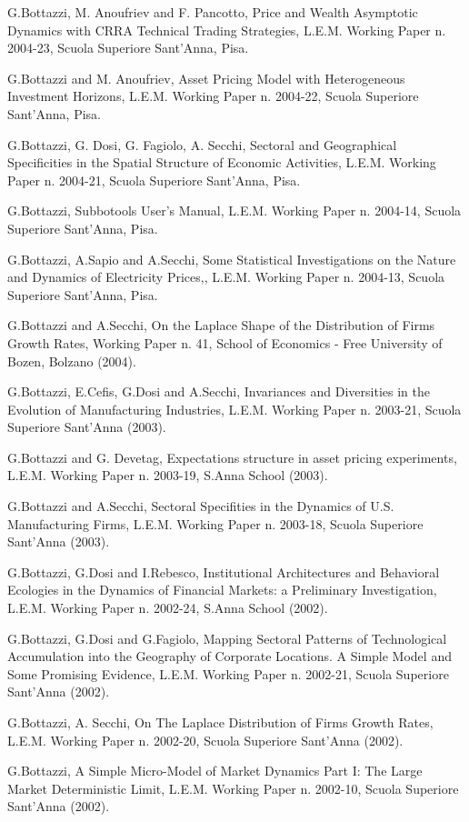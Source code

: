\documentclass[a4paper]{article}
\begin{document}
G.Bottazzi, M. Anoufriev and F. Pancotto, Price and Wealth Asymptotic
Dynamics with CRRA Technical Trading Strategies, L.E.M. Working Paper
n. 2004-23, Scuola Superiore Sant'Anna, Pisa.

G.Bottazzi and M. Anoufriev, Asset Pricing Model with Heterogeneous
Investment Horizons, L.E.M. Working Paper n. 2004-22, Scuola Superiore
Sant'Anna, Pisa.

G.Bottazzi, G. Dosi, G. Fagiolo, A. Secchi, Sectoral and Geographical
Specificities in the Spatial Structure of Economic Activities,
L.E.M. Working Paper n. 2004-21, Scuola Superiore Sant'Anna, Pisa.

G.Bottazzi, Subbotools User's Manual, L.E.M. Working Paper n.
2004-14, Scuola Superiore Sant'Anna, Pisa.

G.Bottazzi, A.Sapio and A.Secchi, Some Statistical Investigations on
the Nature and Dynamics of Electricity Prices,, L.E.M. Working Paper
n. 2004-13, Scuola Superiore Sant'Anna, Pisa.

G.Bottazzi and A.Secchi, On the Laplace Shape of the
Distribution of Firms Growth Rates, Working Paper n. 41, School of
Economics - Free University of Bozen, Bolzano (2004).

G.Bottazzi, E.Cefis, G.Dosi and A.Secchi, Invariances and
Diversities in the Evolution of Manufacturing Industries, L.E.M.
Working Paper n. 2003-21, Scuola Superiore Sant'Anna (2003).

G.Bottazzi and G. Devetag, Expectations structure in asset
pricing experiments, L.E.M. Working Paper n. 2003-19, S.Anna
School (2003).

G.Bottazzi and A.Secchi, Sectoral Specifities in the
Dynamics of U.S. Manufacturing Firms, L.E.M. Working Paper n.
2003-18, Scuola Superiore Sant'Anna (2003).

G.Bottazzi, G.Dosi and I.Rebesco, Institutional Architectures
and Behavioral Ecologies in the Dynamics of Financial Markets: a
Preliminary Investigation, L.E.M. Working Paper n. 2002-24, S.Anna
School (2002).

G.Bottazzi, G.Dosi and G.Fagiolo, Mapping Sectoral Patterns
of Technological Accumulation into the Geography of Corporate
Locations. A Simple Model and Some Promising Evidence, L.E.M.
Working Paper n. 2002-21, Scuola Superiore Sant'Anna (2002).

G.Bottazzi, A. Secchi, On The Laplace Distribution of Firms
Growth Rates, L.E.M. Working Paper n. 2002-20, Scuola Superiore Sant'Anna
(2002).

G.Bottazzi, A Simple Micro-Model of Market Dynamics Part I:
The Large Market Deterministic Limit, L.E.M. Working Paper n.
2002-10, Scuola Superiore Sant'Anna (2002).
\end{document}
